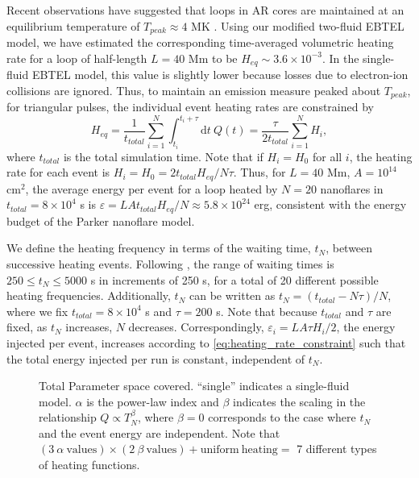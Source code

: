 \documentclass[apj]{emulateapj}
\begin{document}
%
	\par Recent observations have suggested that loops in AR cores are maintained at an equilibrium temperature of $T_{peak}\approx4$ MK \citep{warren_constraints_2011,warren_systematic_2012}. Using our modified two-fluid EBTEL model, we have estimated the corresponding time-averaged volumetric heating rate for a loop of half-length $L=40$ Mm to be  $H_{eq}\sim3.6\times10^{-3}$. In the single-fluid EBTEL model, this value is slightly lower because losses due to electron-ion collisions are ignored. Thus, to maintain an emission measure peaked about $T_{peak}$, for triangular pulses, the individual event heating rates are constrained by 
	\begin{equation}
		\label{eq:heating_rate_constraint}
		H_{eq} = \frac{1}{t_{total}}\sum_{i=1}^N\int_{t_i}^{t_i+\tau}\mathrm{d}t~Q(t) = \frac{\tau}{2t_{total}}\sum_{i=1}^NH_i,
	\end{equation}
	where $t_{total}$ is the total simulation time. Note that if $H_i=H_0$ for all $i$, the heating rate for each event is $H_i=H_0=2t_{total}H_{eq}/N\tau$. Thus, for $L=40$ Mm, $A=10^{14}$ cm$^2$, the average energy per event for a loop heated by $N=20$ nanoflares in $t_{total}=8\times10^4$ s is $\varepsilon=LAt_{total}H_{eq}/N\approx5.8\times10^{24}$ erg, consistent with the energy budget of the Parker nanoflare model. 
	\par We define the heating frequency in terms of the waiting time, $t_N$, between successive heating events. Following \citet{cargill_active_2014}, the range of waiting times is $250\le t_N\le5000$ s in increments of 250 s, for a total of 20 different possible heating frequencies. Additionally, $t_N$ can be written as $t_N=(t_{total}-N\tau)/N$, where we fix $t_{total}=8\times10^4$ s and $\tau=200$ s. Note that because $t_{total}$ and $\tau$ are fixed, as $t_N$ increases, $N$ decreases. Correspondingly, $\varepsilon_i=LA\tau H_i/2$, the energy injected per event, increases according to \autoref{eq:heating_rate_constraint} such that the total energy injected per run is constant, independent of $t_N$.
	\begin{figure}
		\centering
		
		\caption{Total Parameter space covered. ``single'' indicates a single-fluid model. $\alpha$ is the power-law index and $\beta$ indicates the scaling in the relationship $Q\propto T_N^{\beta}$, where $\beta=0$ corresponds to the case where $t_N$ and the event energy are independent. Note that $(3~\alpha~\mathrm{values})\times(2~\beta~\mathrm{values})+\mathrm{uniform~heating}=$ 7 different types of heating functions.}
		\label{fig:parameter_space}
	\end{figure}
\end{document}
